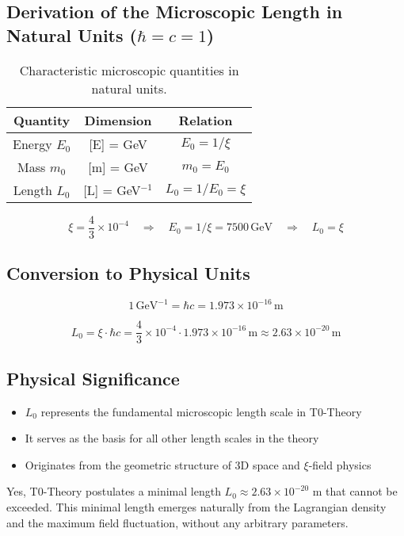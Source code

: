 \documentclass[12pt,a4paper]{article}
\numberwithin{equation}{section}
\begin{document}
	\subsection{Derivation of the Microscopic Length in Natural Units ($\hbar = c = 1$)}
	
	\begin{table}[h!]
		\centering
		\begin{tabular}{ccc}
			\toprule
			\textbf{Quantity} & \textbf{Dimension} & \textbf{Relation} \\
			\midrule
			Energy $E_0$ & [E] = GeV & $E_0 = 1/\xi$ \\
			Mass $m_0$ & [m] = GeV & $m_0 = E_0$ \\
			Length $L_0$ & [L] = GeV$^{-1}$ & $L_0 = 1/E_0 = \xi$ \\
			\bottomrule
		\end{tabular}
		\caption{Characteristic microscopic quantities in natural units.}
	\end{table}
	
	\[
	\xi = \frac{4}{3} \times 10^{-4} \quad \Rightarrow \quad E_0 = 1/\xi = 7500 \,\text{GeV} \quad \Rightarrow \quad L_0 = \xi
	\]
	
	\subsection{Conversion to Physical Units}
	
	\[
	1 \,\text{GeV}^{-1} = \hbar c = 1.973 \times 10^{-16}\,\text{m}
	\]
	
	\[
	L_0 = \xi \cdot \hbar c = \frac{4}{3} \times 10^{-4} \cdot 1.973 \times 10^{-16}\,\text{m} \approx 2.63 \times 10^{-20}\,\text{m}
	\]
	
	\subsection{Physical Significance}
	
	\begin{itemize}
		\item $L_0$ represents the fundamental microscopic length scale in T0-Theory
		\item It serves as the basis for all other length scales in the theory
		\item Originates from the geometric structure of 3D space and $\xi$-field physics
	\end{itemize}
	
\begin{important}
	Yes, T0-Theory postulates a minimal length $L_0 \approx 2.63 \times 10^{-20}$ m that cannot be exceeded. This minimal length emerges naturally from the Lagrangian density and the maximum field fluctuation, without any arbitrary parameters.
\end{important}
	
\end{document}
